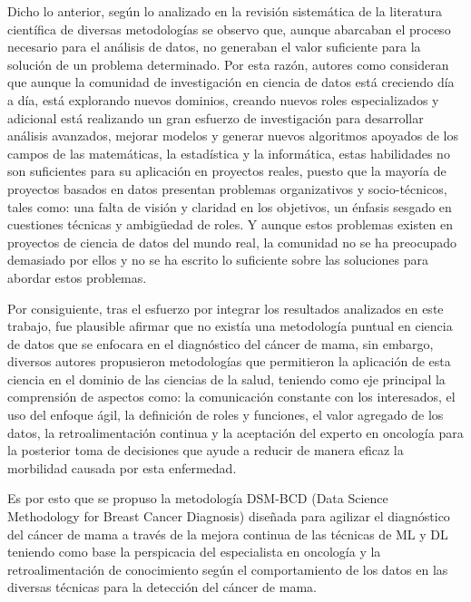 Dicho lo anterior, según lo analizado en la revisión sistemática de la literatura científica de diversas metodologías se observo que, aunque abarcaban el proceso necesario para el análisis de datos, no generaban el valor suficiente para la solución de un problema determinado. Por esta razón, autores como \cite{Martinez2021} consideran que aunque la comunidad de investigación en ciencia de datos está creciendo día a día, está explorando nuevos dominios, creando nuevos roles especializados y adicional está realizando un gran esfuerzo de investigación para desarrollar análisis avanzados, mejorar modelos y generar nuevos algoritmos apoyados de los campos de las matemáticas, la estadística y la informática, estas habilidades no son suficientes para su aplicación en proyectos reales, puesto que la mayoría de proyectos basados en datos presentan problemas organizativos y socio-técnicos, tales como: una falta de visión y claridad en los objetivos, un énfasis sesgado en cuestiones técnicas y ambigüedad de roles. Y aunque estos problemas existen en proyectos de ciencia de datos del mundo real, la comunidad no se ha preocupado demasiado por ellos y no se ha escrito lo suficiente sobre las soluciones para abordar estos problemas.

\newpage
Por consiguiente, tras el esfuerzo por integrar los resultados analizados en este trabajo, fue plausible afirmar que no existía una metodología puntual en ciencia de datos que se enfocara en el diagnóstico del cáncer de mama, sin embargo, diversos autores propusieron metodologías que permitieron la aplicación de esta ciencia en el dominio de las ciencias de la salud, teniendo como eje principal la comprensión de aspectos como: la comunicación constante con los interesados, el uso del enfoque ágil, la definición de roles y funciones, el valor agregado de los datos, la retroalimentación continua y la aceptación del experto en oncología para la posterior toma de decisiones que ayude a reducir de manera eficaz la morbilidad causada por esta enfermedad. 

Es por esto que se propuso la metodología DSM-BCD (Data Science Methodology for Breast Cancer Diagnosis) diseñada para agilizar el diagnóstico del cáncer de mama a través de la mejora continua de las técnicas de ML y DL teniendo como base la perspicacia del especialista en oncología y la retroalimentación  de conocimiento según el comportamiento de los datos en las diversas técnicas para la detección del cáncer de mama.
